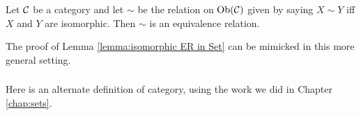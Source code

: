 \documentclass[CT4S-EN-RU]{subfiles}
\begin{document}
\begin{exerciseRUS}
\end{exerciseRUS}

\begin{lemmaENG}\label{lemma:isomorphic ER}
Let $\mathcal{C}$ be a category and let $\sim$ be the relation on $\textnormal{Ob}(\mathcal{C})$ given by saying $X\sim Y$ iff $X$ and $Y$ are isomorphic. Then $\sim$ is an equivalence relation.
\end{lemmaENG}

\begin{lemmaRUS}\label{lemma:isomorphic ER}
\end{lemmaRUS}

\begin{proofENG}
The proof of Lemma \ref{lemma:isomorphic ER in Set} can be mimicked in this more general setting.
\end{proofENG}

\begin{proofRUS}
\end{proofRUS}


\subsubsection{}

\begin{blockENG}
Here is an alternate definition of category, using the work we did in Chapter \ref{chap:sets}.
\end{blockENG}

\begin{blockRUS}
\end{blockRUS}
\end{document}
